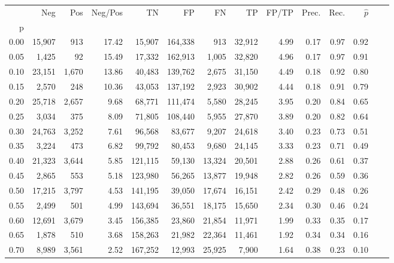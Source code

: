 \begin{tabular}{rrrrrrrrrrrrrr}
\toprule
{} &     Neg &    Pos & Neg/Pos &       TN &       FP &      FN &      TP & FP/TP & Prec. &  Rec. & $\hat{p}$ \\
p    &         &        &         &          &          &         &         &       &       &       &           \\
\midrule
0.00 &  15,907 &    913 &   17.42 &   15,907 &  164,338 &     913 &  32,912 &  4.99 &  0.17 &  0.97 &      0.92 \\
0.05 &   1,425 &     92 &   15.49 &   17,332 &  162,913 &   1,005 &  32,820 &  4.96 &  0.17 &  0.97 &      0.91 \\
0.10 &  23,151 &  1,670 &   13.86 &   40,483 &  139,762 &   2,675 &  31,150 &  4.49 &  0.18 &  0.92 &      0.80 \\
0.15 &   2,570 &    248 &   10.36 &   43,053 &  137,192 &   2,923 &  30,902 &  4.44 &  0.18 &  0.91 &      0.79 \\
0.20 &  25,718 &  2,657 &    9.68 &   68,771 &  111,474 &   5,580 &  28,245 &  3.95 &  0.20 &  0.84 &      0.65 \\
0.25 &   3,034 &    375 &    8.09 &   71,805 &  108,440 &   5,955 &  27,870 &  3.89 &  0.20 &  0.82 &      0.64 \\
0.30 &  24,763 &  3,252 &    7.61 &   96,568 &   83,677 &   9,207 &  24,618 &  3.40 &  0.23 &  0.73 &      0.51 \\
0.35 &   3,224 &    473 &    6.82 &   99,792 &   80,453 &   9,680 &  24,145 &  3.33 &  0.23 &  0.71 &      0.49 \\
0.40 &  21,323 &  3,644 &    5.85 &  121,115 &   59,130 &  13,324 &  20,501 &  2.88 &  0.26 &  0.61 &      0.37 \\
0.45 &   2,865 &    553 &    5.18 &  123,980 &   56,265 &  13,877 &  19,948 &  2.82 &  0.26 &  0.59 &      0.36 \\
0.50 &  17,215 &  3,797 &    4.53 &  141,195 &   39,050 &  17,674 &  16,151 &  2.42 &  0.29 &  0.48 &      0.26 \\
0.55 &   2,499 &    501 &    4.99 &  143,694 &   36,551 &  18,175 &  15,650 &  2.34 &  0.30 &  0.46 &      0.24 \\
0.60 &  12,691 &  3,679 &    3.45 &  156,385 &   23,860 &  21,854 &  11,971 &  1.99 &  0.33 &  0.35 &      0.17 \\
0.65 &   1,878 &    510 &    3.68 &  158,263 &   21,982 &  22,364 &  11,461 &  1.92 &  0.34 &  0.34 &      0.16 \\
0.70 &   8,989 &  3,561 &    2.52 &  167,252 &   12,993 &  25,925 &   7,900 &  1.64 &  0.38 &  0.23 &      0.10 \\

\end{tabular}
